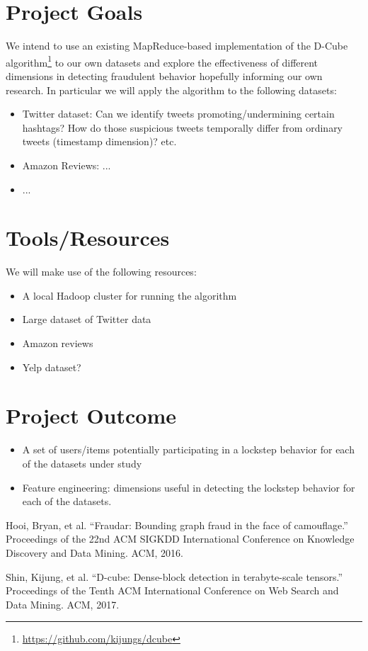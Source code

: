 \documentclass[12pt]{article}
\begin{document}
\section{Project Goals}

We intend to use an existing MapReduce-based implementation of the D-Cube algorithm\footnote{\href{https://github.com/kijungs/dcube}{https://github.com/kijungs/dcube}} to our own datasets and explore the effectiveness of different dimensions in detecting fraudulent behavior hopefully informing our own research. In particular we will apply the algorithm to the following datasets:
\begin{itemize}
\item Twitter dataset: Can we identify tweets promoting/undermining certain hashtags? How do those suspicious tweets temporally differ from ordinary tweets (timestamp dimension)? etc. 
\item Amazon Reviews: ...
\item ...
\end{itemize}
 
\section{Tools/Resources}
We will make use of the following resources:
\begin{itemize}
	\item A local Hadoop cluster for running the algorithm
	\item Large dataset of Twitter data
	\item Amazon reviews
	\item Yelp dataset?
\end{itemize}

\section{Project Outcome}

\begin{itemize}
	\item A set of users/items potentially participating in a lockstep behavior for each of the datasets under study
	\item Feature engineering: dimensions useful in detecting the lockstep behavior for each of the datasets.
\end{itemize}

  
\begin{thebibliography}{99}
 

 Hooi, Bryan, et al. ``Fraudar: Bounding graph fraud in the face of camouflage.'' Proceedings of the 22nd ACM SIGKDD International Conference on Knowledge Discovery and Data Mining. ACM, 2016.

 Shin, Kijung, et al. ``D-cube: Dense-block detection in terabyte-scale tensors.'' Proceedings of the Tenth ACM International Conference on Web Search and Data Mining. ACM, 2017.

\end{thebibliography}
\end{document}
